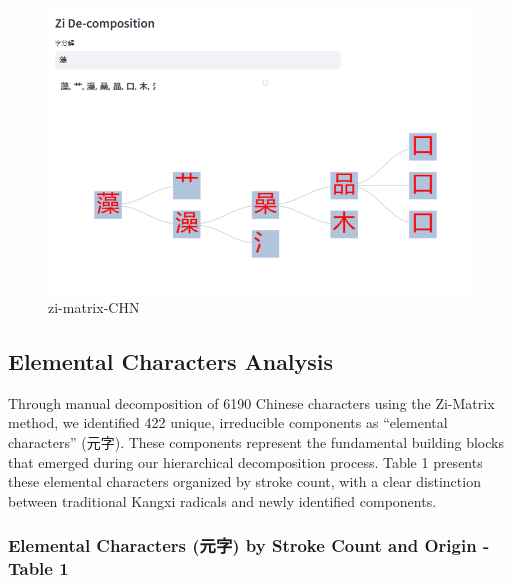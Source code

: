 \begin{figure}
\centering
\includegraphics{./images/app_decomposing-zi.png}
\caption{zi-matrix-CHN}
\end{figure}

\hypertarget{elemental-characters-analysis}{%
\subsection{Elemental Characters
Analysis}\label{elemental-characters-analysis}}

Through manual decomposition of 6190 Chinese characters using the
Zi-Matrix method, we identified 422 unique, irreducible components as
``elemental characters'' (元字). These components represent the
fundamental building blocks that emerged during our hierarchical
decomposition process. Table 1 presents these elemental characters
organized by stroke count, with a clear distinction between traditional
Kangxi radicals and newly identified components.

\hypertarget{elemental-characters-ux5143ux5b57-by-stroke-count-and-origin---table-1}{%
\subsubsection{Elemental Characters (元字) by Stroke Count and Origin -
Table
1}\label{elemental-characters-ux5143ux5b57-by-stroke-count-and-origin---table-1}}

